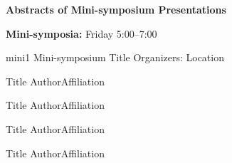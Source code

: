 \begin{center}
{\Large \bfseries Abstracts of Mini-symposium Presentations}
\end{center}
\vspace{1ex}


\begin{center}
\label{mini-friday}
{\large {\bf Mini-symposia:} Friday 5:00--7:00}
\end{center}
\vspace*{1ex}


\mini
{mini1}
{Mini-symposium Title}{}
{Organizers: }
{Location}

\begin{talks}
\item\talk
{Title}
{Author}{Affiliation}

\item\talk
{Title}
{Author}{Affiliation}

\item\talk
{Title}
{Author}{Affiliation}

\item\talk
{Title}
{Author}{Affiliation}
\end{talks}
\room
